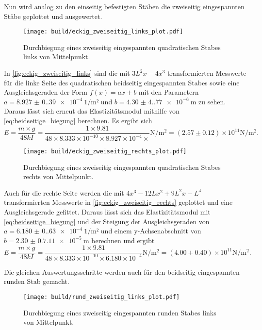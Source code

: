 \noindent Nun wird analog zu den einseitig befestigten Stäben die zweiseitig eingespannten Stäbe geplottet und ausgewertet.
\begin{figure}[H]
  \centering
  \texttt{[image: build/eckig\_zweiseitig\_links\_plot.pdf]}
  \caption{Durchbiegung eines zweiseitig eingespannten quadratischen Stabes links von Mittelpunkt.}
  \label{fig:eckig_zweiseitig_links}
\end{figure}
\noindent In \autoref{fig:eckig_zweiseitig_links} sind die mit $3L^2x-4x^3$ transformierten Messwerte für die linke Seite des quadratischen beidseitig eingespannten Stabes sowie eine Ausgleichsgeraden der Form $f(x)=ax+b$ mit den Parametern $a=\SI{8.927(0.39)e-4}{1\per\meter²}$ und $b=\SI{4.30(4.77)e-6}{\meter}$ zu sehen. Daraus lässt sich erneut das Elastizitätsmodul mithilfe von \autoref{eq:beidseitige_biegung} berechnen. Es ergibt sich
\begin{equation*}
  E=\frac{m \times g}{48kI} = \frac{1 \times 9.81}{48 \times 8.333 \times 10^{-10} \times 8.927 \times 10^{-4} \times} \unit{\newton\per\meter\squared} = (2.57 \pm 0.12) \times 10^{11} \unit{\newton\per\meter\squared}.
\end{equation*}

\begin{figure}[H]
  \centering
  \texttt{[image: build/eckig\_zweiseitig\_rechts\_plot.pdf]}
  \caption{Durchbiegung eines zweiseitig eingespannten quadratischen Stabes rechts von Mittelpunkt.}
  \label{fig:eckig_zweiseitig_rechts}
\end{figure}

\noindent Auch für die rechte Seite werden die mit $4x^3-12Lx^2+9L^2x-L^4$ transformierten Messwerte in \autoref{fig:eckig_zweiseitig_rechts} geplottet und eine Ausgleichsgerade gefittet. Daraus lässt sich das Elastizitätsmodul mit \autoref{eq:beidseitige_biegung} und der Steigung der Ausgleichsgeraden von $a=\SI{6.180(0.63)e-4}{1\per\meter²}$ und einem y-Achsenabschnitt von $b=\SI{2.30(0.711)e-5}{\meter}$ berechnen und ergibt
\begin{equation*}
  E=\frac{m \times g}{48kI} = \frac{1 \times 9.81}{48 \times 8.333 \times 10^{-10} \times 6.180 \times 10^{-4}} \unit{\newton\per\meter\squared} = (4.00 \pm 0.40) \times 10^{11} \unit{\newton\per\meter\squared}\text{.}
\end{equation*}

\noindent Die gleichen Auswertungsschritte werden auch für den beidseitig eingespannten runden Stab gemacht.


\begin{figure}[H]
  \centering
  \texttt{[image: build/rund\_zweiseitig\_links\_plot.pdf]}
  \caption{Durchbiegung eines zweiseitig eingespannten runden Stabes links von Mittelpunkt.}
  \label{fig:rund_zweiseitig_links}
\end{figure}

